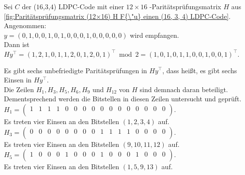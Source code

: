     \begin{Beispiel}
        Sei $C$ der (\(16\),\(3\),\(4\)) LDPC-Code mit einer $12 \times 16$ -Paritätsprüfungsmatrix $H$ aus 
        \autoref{fig:Paritätsprüfungsmatrix (12×16) H F{\"u} einen (16, 3, 4) LDPC-Code}.\\
        
        Angenommen:\\
        $y = (0,1,0,0,1,0,1,0,0,0,1,0,0,0,0,0)$ wird empfangen.\\
        
        Dann ist $Hy^\intercal = (1,2,1,0,1,1,2,0,1,2,0,1)^\intercal \bmod 2 = (1,0,1,0,1,1,0,0,1,0,0,1)^\intercal$.
        
        Es gibt sechs unbefriedigte Paritätsprüfungen in $Hy^\intercal$, dass hei\ss{}t, es gibt sechs Einsen in $Hy^\intercal.$\\
        Die Zeilen $H_1, H_3, H_5, H_6, H_9$ und $H_{12}$ von $H$ sind demnach daran beteiligt.\\ Dementsprechend werden die Bitstellen in diesen Zeilen untersucht und geprüft.\\
        
        $H_1= \left( \begin{array}{rrrrrrrrrrrrrrrr}
            1 & 1 & 1 & 1 & 0 & 0 & 0 & 0 & 0 & 0 & 0 & 0 & 0 & 0 & 0 & 0 \\
           \end{array}\right). 
        $\\
        Es treten vier Einsen an den Bitstellen $(1, 2, 3, 4)$ auf.\\
        
        $H_3= \left( \begin{array}{rrrrrrrrrrrrrrrr}
            0 & 0 & 0 & 0 & 0 & 0 & 0 & 0 & 1 & 1 & 1 & 1 & 0 & 0 & 0 & 0 \\
           \end{array}\right). 
        $\\
        Es treten vier Einsen an den Bitstellen $(9, 10, 11, 12)$ auf.\\
        
        $H_5= \left( \begin{array}{rrrrrrrrrrrrrrrr}
            1 & 0 & 0 & 0 & 1 & 0 & 0 & 0 & 1 & 0 & 0 & 0 & 1 & 0 & 0 & 0 \\
           \end{array}\right). 
        $\\
        Es treten vier Einsen an den Bitstellen $(1, 5, 9, 13)$ auf.\\
        

\end{Beispiel}
